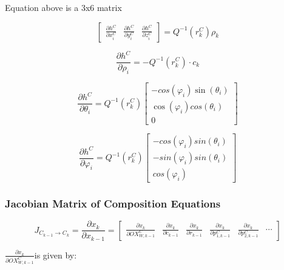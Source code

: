Equation above is a 3x6 matrix

\begin{equation}
\begin{bmatrix}
\frac{\partial h^{C}}{\partial x_{i}^{C}} & 
\frac{\partial h^{C}}{\partial y_{i}^{C}} & 
\frac{\partial h^{C}}{\partial z_{i}^{C}}
\end{bmatrix}
 =Q^{-1}(r_{k}^{C})\rho _{k}
\end{equation}


\begin{equation}
\frac{\partial h^{C}}{\partial \rho _{i}}=-Q^{-1}(r_{k}^{C})\cdot c_{k}
\end{equation}


\begin{equation}
\frac{\partial h^{C}}{\partial \theta _{i}}=
Q^{-1}(r_{k}^{C}) \begin{bmatrix}
-cos(\varphi _{i})\sin(\theta _{i}) \\
\cos (\varphi _{i})cos(\theta _{i}) \\
0 \end{bmatrix}
\end{equation}

\begin{equation}
\frac{\partial h^{C}}{\partial \varphi _{i}}= 
Q^{-1}(r_{k}^{C}) \begin{bmatrix}
-cos(\varphi _{i})sin(\theta _{i}) \\
-sin(\varphi _{i})sin(\theta _{i}) \\
cos(\varphi _{i})
\end{bmatrix}
\end{equation}

\subsubsection{Jacobian Matrix of Composition Equations}

\begin{equation}
J_{C_{k-1}\to C_{k}}=\frac{\partial x_{k}}{\partial x_{k-1}}=\begin{bmatrix}
\frac{\partial x_{k}}{\partial OX_{W, k-1}^{C}} &
\frac{\partial x_{k}}{\partial c_{k-1}} & 
\frac{\partial x_{k}}{\partial r_{k-1}} & 
\frac{\partial x_{k}}{\partial p_{1, k-1}^{C}} &
\frac{\partial x_{k}}{\partial p_{2, k-1}^{C}} &
\cdots 
\end{bmatrix}
\end{equation}

$\frac{\partial x_{k}}{\partial OX_{W, k-1}^{C}}$is given by:

